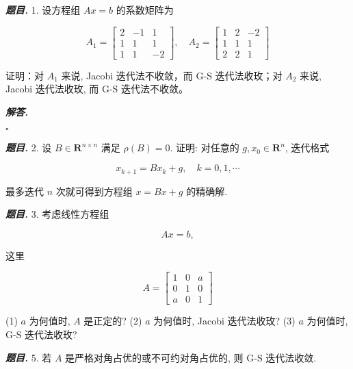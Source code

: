 \documentclass[10pt, a4paper, oneside]{ctexart}
\newenvironment{problem}{\begin{framed}\par\noindent\textbf{\textit{题目. }}}{\end{framed}\par}
\newenvironment{solution}{%
  \par\noindent\textbf{\textit{解答. }}\ignorespaces
}{%
  \hfill\ensuremath{\square}\par %
}
\begin{document}
\begin{problem}
    1. 设方程组 $A x=b$ 的系数矩阵为

    $$
    A_1=\left[\begin{array}{rrr}
    2 & -1 & 1 \\
    1 & 1 & 1 \\
    1 & 1 & -2
    \end{array}\right], \quad A_2=\left[\begin{array}{rrr}
    1 & 2 & -2 \\
    1 & 1 & 1 \\
    2 & 2 & 1
    \end{array}\right]
    $$
    
    
    证明：对 $A_1$ 来说, Jacobi 迭代法不收敛，而 G-S 迭代法收玫；对 $A_2$ 来说, Jacobi 迭代法收玫, 而 G-S 迭代法不收敛。
\end{problem}
\begin{solution}

\end{solution}

\begin{problem}
    2. 设 $B \in \mathbf{R}^{n \times n}$ 满足 $\rho(B)=0$. 证明: 对任意的 $g, x_0 \in \mathbf{R}^n$, 迭代格式

    $$
    x_{k+1}=B x_k+g, \quad k=0,1, \cdots
    $$
    
    
    最多迭代 $n$ 次就可得到方程组 $x=B x+g$ 的精确解.
\end{problem}

\begin{problem}
    3. 考虑线性方程组

    $$
    A x=b,
    $$
    
    
    这里
    
    $$
    A=\left[\begin{array}{lll}
    1 & 0 & a \\
    0 & 1 & 0 \\
    a & 0 & 1
    \end{array}\right]
    $$
    
    (1) $a$ 为何值时, $A$ 是正定的?
    (2) $a$ 为何值时, Jacobi 迭代法收玫?
    (3) $a$ 为何值时, G-S 迭代法收玫?
\end{problem}

\begin{problem}
    5. 若 $A$ 是严格对角占优的或不可约对角占优的, 则 G-S 迭代法收敛.
\end{problem}
\end{document}
